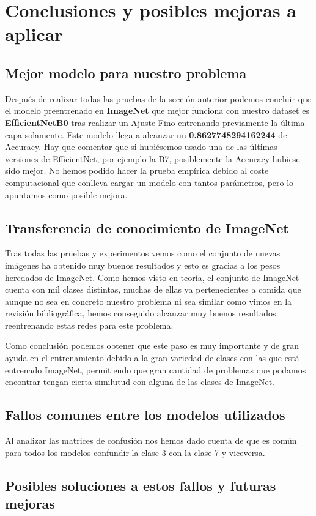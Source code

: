 \section{Conclusiones y posibles mejoras a aplicar}

\subsection{Mejor modelo para nuestro problema}

Después de realizar todas las pruebas de la sección anterior podemos concluir que el modelo preentrenado en \textbf{ImageNet} que mejor funciona con nuestro dataset es \textbf{EfficientNetB0} tras realizar un Ajuste Fino entrenando previamente la última capa solamente. Este modelo llega a alcanzar un \textbf{0.8627748294162244} de Accuracy. Hay que comentar que si hubiésemos usado una de las últimas versiones de EfficientNet, por ejemplo la B7, posiblemente la Accuracy hubiese sido mejor. No hemos podido hacer la prueba empírica debido al coste computacional que conlleva cargar un modelo con tantos parámetros, pero lo apuntamos como posible mejora.

\subsection{Transferencia de conocimiento de ImageNet}

Tras todas las pruebas y experimentos vemos como el conjunto de nuevas imágenes ha obtenido muy buenos resultados y esto es gracias a los pesos heredados de ImageNet. Como hemos visto en teoría, el conjunto de ImageNet cuenta con mil clases distintas, muchas de ellas ya pertenecientes a comida que aunque no sea en concreto nuestro problema ni sea similar como vimos en la revisión bibliográfica, hemos conseguido alcanzar muy buenos resultados reentrenando estas redes para este problema.

Como conclusión podemos obtener que este paso es muy importante y de gran ayuda en el entrenamiento debido a la gran variedad de clases con las que está entrenado ImageNet, permitiendo que gran cantidad de problemas que podamos encontrar tengan cierta similutud con alguna de las clases de ImageNet.


\subsection{Fallos comunes entre los modelos utilizados}

Al analizar las matrices de confusión nos hemos dado cuenta de que es común para todos los modelos confundir la clase 3 con la clase 7 y viceversa. 

\subsection{Posibles soluciones a estos fallos y futuras mejoras}
